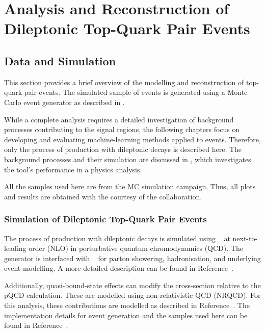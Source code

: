 \chapter{Analysis and Reconstruction of Dileptonic Top-Quark Pair Events}
\label{chap:reconstruction-methods}

\section{Data and Simulation}
\label{sec:data-and-simulation}
This section provides a brief overview of the modelling and reconstruction of top-quark pair events. The simulated sample of \ttbar events is generated using a Monte Carlo event generator as described in .

While a complete analysis requires a detailed investigation of background processes contributing to the signal regions, the following chapters focus on developing and evaluating machine-learning methods applied to \ttbar events.
Therefore, only the process of \ttbar production with dileptonic decays is described here. The background processes and their simulation are discussed in , which investigates the tool's performance in a physics analysis.

All the samples used here are from the \atlas MC simulation campaign. Thus, all plots and results are obtained with the courtesy of the \atlas collaboration.

\subsection{Simulation of Dileptonic Top-Quark Pair Events}
\label{sec:nominal_ttbar}
The process of \ttbar production with dileptonic decays is simulated using \powheg~\cite{powheg} at next-to-leading order (NLO) in perturbative quantum chromodynamics (QCD). The \powheg generator is interfaced with \pythia~\cite{pythia} for parton showering, hadronisation, and underlying event modelling. A more detailed description can be found in Reference~\cite{atlas_toponium}.

Additionally, quasi-bound-state effects can modify the cross-section relative to the pQCD calculation. These are modelled using non-relativistic QCD (NRQCD). For this analysis, these contributions are modelled as described in Reference~\cite{NRQCD_toponium_2}. The implementation details for event generation and the samples used here can be found in Reference~\cite{atlas_toponium}.

